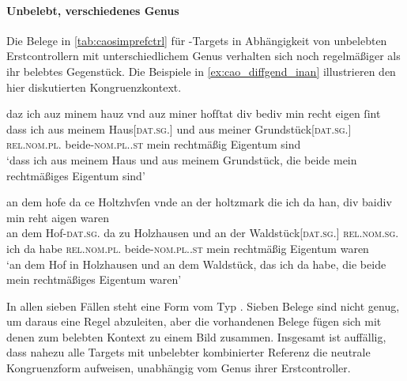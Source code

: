 \paragraph{Unbelebt, verschiedenes Genus}

Die Belege in \cref{tab:caosimprefctrl} für -Targets in
Abhängigkeit von unbelebten Erstcontrollern mit unterschiedlichem Genus
verhalten sich noch regelmäßiger als ihr belebtes Gegenstück. Die Beispiele in
\cref{ex:cao_diffgend_inan} illustrieren den hier diskutierten
Kongruenzkontext.

\begin{exe}
\ex \label{ex:cao_diffgend_inan}
	\begin{xlist}
	\ex \label{ex:cao_diffgend_inan_1}
		\gll daz ich auz minem hauz vnd auz miner hofſtat
			div bediv min recht eigen ſint \\
			dass ich aus meinem Haus[\textsc{dat.sg.\NeutI}] und aus meiner
			Grundstück[\textsc{dat.sg.\FemI}] \textsc{rel.nom.pl.\NeutI}
			beide-\textsc{nom.pl.\NeutI.st} mein rechtmäßig Eigentum sind \\
		\trans `dass ich aus meinem Haus und aus meinem Grundstück, die 
			beide mein rechtmäßiges Eigentum sind'
			\parencites(Nr.~1282, Regensburg, 1290)[526,37--38]{cao2}

	\ex \label{ex:cao_diffgend_inan_2}
		\gll an dem hofe da ce Holtzhvſen \textelp{} vnde an der
			holtzmark die ich da han, div baidiv min
			reht aigen waren \\
			an dem Hof-\textsc{dat.sg.\MascI} da zu Holzhausen {} und an der
			Waldstück[\textsc{dat.sg.\FemI}] \textsc{rel.nom.sg.\FemI} ich da habe
			\textsc{rel.nom.pl.\NeutI} beide-\textsc{nom.pl.\NeutI.st} mein
			rechtmäßig Eigentum waren \\
		\trans `an dem Hof in Holzhausen \textelp{} und an dem Waldstück,
			das ich da habe, die beide mein rechtmäßiges Eigentum waren'
			\parencites(Nr.~N~272, Augsburg, 1285)[215,30--31]{cao5}
	\end{xlist}
\end{exe}

In allen sieben Fällen steht eine Form vom Typ . Sieben Belege
sind nicht genug, um daraus eine Regel abzuleiten, aber die vorhandenen Belege
fügen sich mit denen zum belebten Kontext zu einem Bild zusammen. Insgesamt ist
auffällig, dass nahezu alle Targets mit unbelebter kombinierter Referenz die
neutrale Kongruenzform  aufweisen, unabhängig vom Genus ihrer
Erstcontroller.

